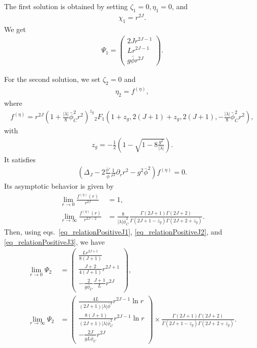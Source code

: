 \documentclass[12pt]{article}
\begin{document}
The first solution is obtained by setting $\zeta_1 = 0,\eta_1 = 0$, and
\begin{align}
 \chi_1 = r^{2J}.
\end{align}
We get
\begin{align}
 \Psi_1 =
 \begin{pmatrix}
  2Jr^{2J-1} \\
  Lr^{2J-1}  \\
  g\bar\phi r^{2J}
 \end{pmatrix}.
\end{align}

For the second solution, we set $\zeta_2 = 0$ and
\begin{align}
 \eta_2 = f^{(\eta)},
\end{align}
where
\begin{align}
 f^{(\eta)} = r^{2J}
 \left(
  1+\frac{|\lambda|}{8}\bar\phi_C^2r^2
 \right)^{z_g}{}_2F_1
 \left(
  1+z_g,2(J+1)+z_g,2(J+1),-\frac{|\lambda|}{8}\bar\phi_C^2r^2
 \right),
\end{align}
with
\begin{align}
 z_g = -\frac{1}{2}\left(
  1-\sqrt{1-8\frac{g^2}{|\lambda|}}
 \right).
\end{align}
It satisfies
\begin{align}
 \left(
  \Delta_J-2\frac{\bar\phi'}{\bar\phi}\frac{1}{r^2}\partial_rr^2-g^2\bar\phi^2
 \right)f^{(\eta)} = 0.
\end{align}
Its asymptotic behavior is given by
\begin{align}
 \lim_{r\to0}\frac{f^{(\eta)}(r)}{r^{2J}}
  & = 1,                              \\
 \lim_{r\to\infty}\frac{f^{(\eta)}(r)}{r^{2J-2}}
  & = \frac{8}{|\lambda|\bar\phi_C^2}
 \frac{\Gamma(2J+1)\Gamma(2J+2)}{\Gamma(2J+1-z_g)\Gamma(2J+2+z_g)}.
\end{align}
Then, using eqs.~\eqref{eq_relationPositiveJ1}, \eqref{eq_relationPositiveJ2}, and
\eqref{eq_relationPositiveJ3}, we have
\begin{align}
 \lim_{r\to0}\Psi_2      & =
 \begin{pmatrix}
  \frac{Lr^{2J+1}}{8(J+1)}   \\
  \frac{J+2}{4(J+1)}r^{2J+1} \\
  -\frac{2}{g\bar\phi_C}\frac{J+1}{L}r^{2J}
 \end{pmatrix}, \\
 \lim_{r\to\infty}\Psi_2 & =
 \begin{pmatrix}
  \frac{4L}{(2J+1)|\lambda|\bar\phi^2}r^{2J-1}\ln r       \\
  \frac{8(J+1)}{(2J+1)|\lambda|\bar\phi_C^2}r^{2J-1}\ln r \\
  -\frac{2J}{gL\bar\phi_C}r^{2J}
 \end{pmatrix}\times\frac{\Gamma(2J+1)\Gamma(2J+2)}{\Gamma(2J+1-z_g)\Gamma(2J+2+z_g)}.
\end{align}
\end{document}
